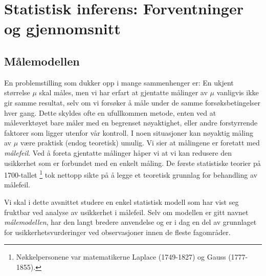 \chapter{Statistisk inferens: Forventninger og gjennomsnitt}
\label{kap:forventninger_og_gjennomsnitt} %

\section{Målemodellen}

En problemstilling som dukker opp i mange sammenhenger er:
En ukjent størrelse $\mu$ skal måles, men vi har erfart at gjentatte
målinger av $\mu$ vanligvis ikke gir samme resultat, selv om
vi forsøker å måle under de samme
forsøksbetingelser hver gang. Dette skyldes ofte en
ufullkommen metode, enten ved at måleverktøyet bare
måler med en begrenset nøyaktighet, eller andre
forstyrrende faktorer som ligger utenfor vår kontroll. I noen
situasjoner kan nøyaktig måling av $\mu$ være praktisk
(endog teoretisk) umulig. Vi sier at målingene er foretatt
med {\em målefeil}. Ved å foreta gjentatte målinger
håper vi at vi kan redusere den usikkerhet som er forbundet
med en enkelt måling. De første statistiske teorier på 
1700-tallet \footnote{Nøkkelpersonene var
matematikerne Laplace (1749-1827) og Gauss (1777-1855).}
tok nettopp sikte på å legge et teoretisk grunnlag for
behandling av målefeil.

Vi skal i dette avsnittet studere en enkel statistisk modell
som har vist seg fruktbar ved analyse av usikkerhet i målefeil.
Selv om modellen er gitt navnet {\em målemodellen},
har den langt bredere anvendelse og er i dag en del av grunnlaget for
usikkerhetsvurderinger ved observasjoner innen de fleste fagområder.

